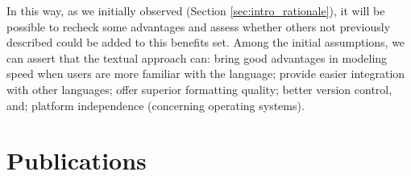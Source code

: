 In this way, as we initially observed (Section \ref{sec:intro_rationale}), it will be possible to recheck some advantages and assess whether others not previously described could be added to this benefits set.
Among the initial assumptions, we can assert that the textual approach can: bring good advantages in modeling speed when users are more familiar with the language; provide easier integration with other languages; offer superior formatting quality; better version control, and; platform independence (concerning operating systems).

\section{Publications}


